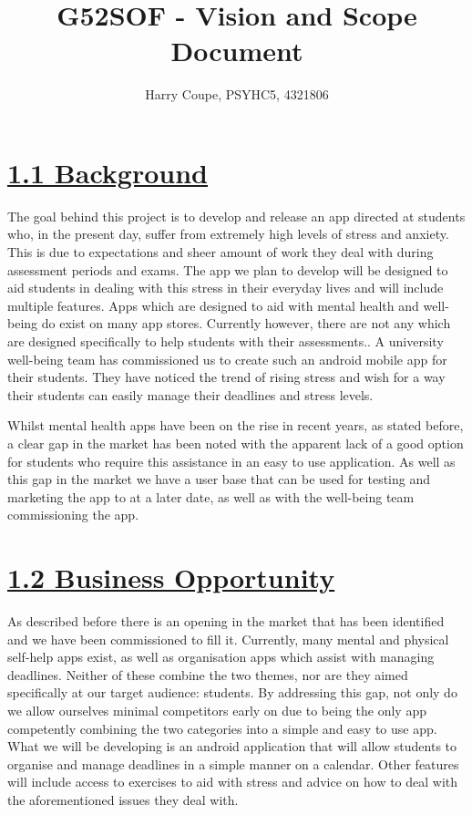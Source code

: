 \documentclass[a4paper]{article}
\begin{document}
\title{G52SOF - Vision and Scope Document}
\author{Harry Coupe, PSYHC5, 4321806}
\maketitle
\pagebreak


\section*{\underline{1.1 Background}}
The goal behind this project is to develop and release an app directed at students who, in the present day,
suffer from extremely high levels of stress and anxiety. This is due to expectations and sheer amount of work they deal
with during assessment periods and exams. The app we plan to develop will be designed to aid students in dealing with this
stress in their everyday lives and will include multiple features. Apps which are designed to aid with mental health and well-being do exist on many app stores. Currently however, there are not any which are designed specifically to help students with their assessments.. A university well-being team has commissioned us to create such an android mobile app for their students. They have noticed the trend of rising stress and wish for a way their students can easily manage their deadlines and stress levels.

Whilst mental health apps have been on the rise in recent years, as stated before, a clear gap in the market has been noted with the apparent lack of a good option for students who require this assistance in an easy to use application. As well as this gap in the market we have a user base that can be used for testing and marketing the app to at a later date, as well as with the well-being team commissioning the app.


\section*{\underline{1.2 Business Opportunity}}
As described before there is an opening in the market that has been identified and we have been commissioned to fill it. Currently, many mental and physical self-help apps exist, as well as organisation apps which assist with managing deadlines. Neither of these combine the two themes, nor are they aimed specifically at our target audience: students. By addressing this gap, not only do we allow ourselves minimal competitors early on due to being the only app competently combining the two categories into a simple and easy to use app. 
What we will be developing is an android application that will allow students to organise and manage deadlines in a simple manner on a calendar. Other features will include access to exercises to aid with stress and advice on how to deal with the aforementioned issues they deal with.   
\end{document}
